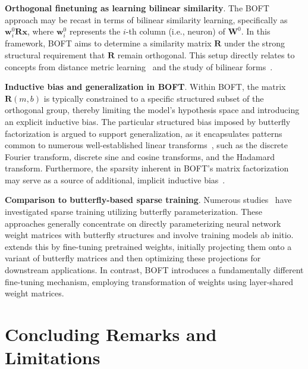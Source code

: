 \textbf{Orthogonal finetuning as learning bilinear similarity}. The BOFT approach may be recast in terms of bilinear similarity learning, specifically as $\bm{w}^0_i\bm{R}\bm{x}$, where $\bm{w}^0_i$ represents the $i$-th column (i.e., neuron) of $\bm{W}^0$. In this framework, BOFT aims to determine a similarity matrix $\bm{R}$ under the strong structural requirement that $\bm{R}$ remain orthogonal. This setup directly relates to concepts from distance metric learning~\cite{xing2002distance} and the study of bilinear forms~\cite{roman2005advanced}.

\textbf{Inductive bias and generalization in BOFT}. Within BOFT, the matrix $\bm{R}(m,b)$ is typically constrained to a specific structured subset of the orthogonal group, thereby limiting the model’s hypothesis space and introducing an explicit inductive bias. The particular structured bias imposed by butterfly factorization is argued to support generalization, as it encapsulates patterns common to numerous well-established linear transforms~\cite{dao2019kaleidoscope}, such as the discrete Fourier transform, discrete sine and cosine transforms, and the Hadamard transform. Furthermore, the sparsity inherent in BOFT’s matrix factorization may serve as a source of additional, implicit inductive bias~\cite{gunasekar2017implicit,li2018algorithmic,liu2019neural}.

\textbf{Comparison to butterfly-based sparse training}. Numerous studies~\cite{dao2019learning,dao2019kaleidoscope,chen2022pixelated,dao2022monarch} have investigated sparse training utilizing butterfly parameterization. These approaches generally concentrate on directly parameterizing neural network weight matrices with butterfly structures and involve training models ab initio. \cite{dao2022monarch} extends this by fine-tuning pretrained weights, initially projecting them onto a variant of butterfly matrices and then optimizing these projections for downstream applications. In contrast, BOFT introduces a fundamentally different fine-tuning mechanism, employing transformation of weights using layer-shared weight matrices.



\section{Concluding Remarks and Limitations}

